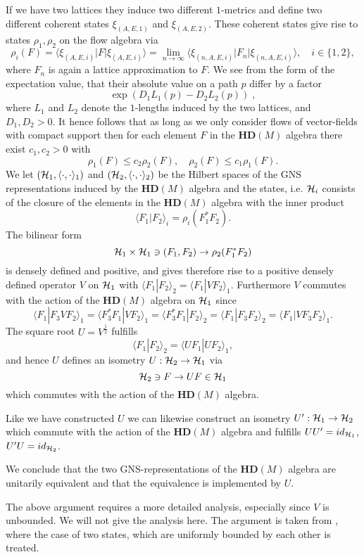 \documentclass[12pt]{article}
\def\ch{{\cal H}}
\begin{document}
If we have two lattices they induce two different $1$-metrics and define two different coherent states $\xi_{(A,E,1)} $ and $\xi_{(A,E,2)}$. These coherent states give rise to states $\rho_1, \rho_2$ on the flow algebra via
$$ \rho_i (F)=\langle \xi_{(A,E,i)} | F|\xi_{(A,E,i)}  \rangle =\lim_{n\to \infty}  \langle \xi_{(n,A,E,i)} | F_n|\xi_{(n,A,E,i)}  \rangle , \quad i\in \{1,2 \},$$
where $F_n$ is again a lattice approximation to $F$. 
We see from the form of the expectation value, that their absolute value on a path $p$ differ by a factor $$ \exp(D_1L_1(p)-D_2L_2(p))\;,$$ where $L_1$ and $L_2$ denote the $1$-lengths induced by the two lattices, and $D_1,D_2>0$. It hence follows that as long as we only consider flows of vector-fields with compact support then for each element $F$ in the $\mathbf{HD}(M)$ algebra there exist $c_1,c_2>0$ with 
$$ \rho_1(F)\leq c_2\rho_2 (F), \quad  \rho_2(F)\leq c_1\rho_1 (F). $$   
We let $(\ch_1,\langle \cdot , \cdot \rangle_1 )$ and $(\ch_2,\langle \cdot , \cdot \rangle_2 )$ be the Hilbert spaces of the GNS representations induced by the $\mathbf{HD}(M)$ algebra and the states, i.e. $\ch_i$ consists of the closure of the elements in the $\mathbf{HD}(M)$ algebra with the inner product
$$\langle F_1|F_2 \rangle_i= \rho_i (F_1^*F_2) .$$
The bilinear form 
$$ \ch_1\times \ch_1 \ni (F_1,F_2)\to \rho_2(F_1^*F_2)  $$ 
is densely defined and positive, and gives therefore rise to a positive densely defined operator $V$ on $\ch_1$ with $\langle F_1|F_2\rangle_2=\langle F_1|VF_2\rangle_1 $. Furthermore $V$ commutes with the action of the $\mathbf{HD}(M)$ algebra on $\ch_1$ since 
$$ \langle F_1|F_3VF_2 \rangle_1=\langle F_3^*F_1|VF_2 \rangle_1= \langle F_3^*F_1|F_2 \rangle_2 =\langle F_1|F_3F_2 \rangle_2=\langle F_1|VF_3F_2 \rangle_1 .$$
 The square root $U=V^{\frac12}$ fulfills 
$$\langle F_1|F_2\rangle_2=\langle U F_1|U F_2\rangle_1 ,$$
and hence $U$ defines an isometry $U:\ch_2\to \ch_1$ via
$$\ch_2\ni F \to UF\in \ch_1  $$
which commutes with the action of the $\mathbf{HD}(M)$ algebra. 

Like we have constructed $U$ we can likewise construct an isometry $U':\ch_1\to \ch_2$ which commute with the action of the $\mathbf{HD}(M)$ algebra and fulfills $UU'=id_{\ch_1}$, $U'U=id_{\ch_2}$. 

We conclude that the two GNS-representations of the $\mathbf{HD}(M)$ algebra are unitarily equivalent and that the equivalence is implemented by $U$.

The above argument requires a more detailed analysis, especially since $V$ is unbounded. We will not give the analysis here. The argument is taken from \cite{murphybook}, where the case of two states, which are uniformly bounded by each other is treated.
\end{document}
